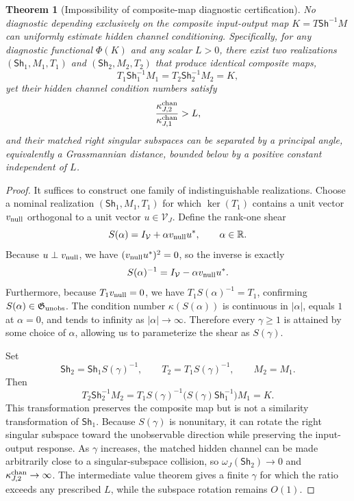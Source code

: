 \documentclass[review]{siamart220329}
\newtheorem{theorem}{Theorem}[section]
\theoremstyle{definition}
\theoremstyle{remark}
\newcommand{\R}{\mathbb{R}}
\newcommand{\calV}{\mathcal{V}}
\newcommand{\Sh}{\mathsf{Sh}}
\begin{document}
\begin{theorem}[Impossibility of composite-map diagnostic certification]
\label{thm:extremal-nonidentifiability}
No diagnostic depending exclusively on the composite input-output map
$K=T\Sh^{-1}M$ can uniformly estimate hidden channel conditioning. Specifically,
for any diagnostic functional $\Phi(K)$ and any scalar $L>0$, there exist two
realizations $(\Sh_1,M_1,T_1)$ and $(\Sh_2,M_2,T_2)$ that produce identical
composite maps,
\begin{equation}
    T_1\Sh_1^{-1}M_1=T_2\Sh_2^{-1}M_2=K,
\end{equation}
yet their hidden channel condition numbers satisfy
\begin{equation}
    \frac{\kappa_{J,2}^{\rm chan}}{\kappa_{J,1}^{\rm chan}}>L,
\end{equation}
and their matched right singular subspaces can be separated by a principal
angle, equivalently a Grassmannian distance, bounded below by a positive
constant independent of $L$.
\end{theorem}

\begin{proof}
It suffices to construct one family of indistinguishable realizations. Choose a
nominal realization $(\Sh_1,M_1,T_1)$ for which $\ker(T_1)$ contains a unit
vector $v_{\rm null}$ orthogonal to a unit vector $u\in\calV_J$. Define the
rank-one shear
\begin{equation}
    S(\alpha)=I_\calV+\alpha v_{\rm null}u^*,
    \qquad \alpha\in\R .
\end{equation}
Because $u\perp v_{\rm null}$, we have $(v_{\rm null}u^*)^2=0$, so the inverse
is exactly
\begin{equation}
    S(\alpha)^{-1}=I_\calV-\alpha v_{\rm null}u^* .
\end{equation}
Furthermore, because $T_1v_{\rm null}=0$, we have
$T_1S(\alpha)^{-1}=T_1$, confirming
$S(\alpha)\in\mathfrak G_{\rm unobs}$. The condition number
$\kappa(S(\alpha))$ is continuous in $|\alpha|$, equals $1$ at $\alpha=0$, and
tends to infinity as $|\alpha|\to\infty$. Therefore every $\gamma\geq1$ is
attained by some choice of $\alpha$, allowing us to parameterize the shear as
$S(\gamma)$.


Set
\begin{equation}
    \Sh_2=\Sh_1S(\gamma)^{-1},\qquad
    T_2=T_1S(\gamma)^{-1},\qquad
    M_2=M_1 .
\end{equation}
Then
\begin{equation}
    T_2\Sh_2^{-1}M_2
    =
    T_1S(\gamma)^{-1}\bigl(S(\gamma)\Sh_1^{-1}\bigr)M_1
    =
    K.
\end{equation}
This transformation preserves the composite map but is not a similarity
transformation of $\Sh_1$. Because $S(\gamma)$ is nonunitary, it can rotate the
right singular subspace toward the unobservable direction while preserving the
input-output response. As $\gamma$ increases, the matched hidden channel can be
made arbitrarily close to a singular-subspace collision, so
$\omega_J(\Sh_2)\to0$ and $\kappa_{J,2}^{\rm chan}\to\infty$. The intermediate
value theorem gives a finite $\gamma$ for which the ratio exceeds any prescribed
$L$, while the subspace rotation remains $O(1)$.
\end{proof}
\end{document}
